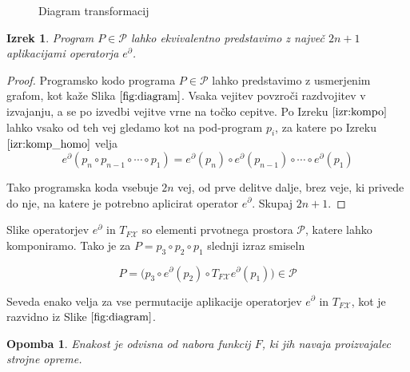 \documentclass{article}
\newcommand{\X}{\mathcal{X}}
\newcommand{\dP}{\mathcal{P}}
\newcommand{\D}{\partial}
\newtheorem{izrek}{Izrek}[section]
\newtheorem{opomba}{Opomba}[section]
\begin{document}
\begin{figure}[!h]
\vspace{3px}
\caption{Diagram transformacij} \label{fig:diagram} 
\end{figure}

\begin{izrek}
Program $P\in\dP$ lahko ekvivalentno predstavimo z največ $2n+1$ aplikacijami operatorja $e^\D$.
\end{izrek}

\begin{proof}
	Programsko kodo programa $P\in\dP$ lahko predstavimo z usmerjenim grafom, kot kaže Slika $\ref{fig:diagram}$. Vsaka vejitev povzroči razdvojitev v izvajanju, a se po izvedbi vejitve vrne na točko cepitve.	
	Po Izreku $\ref{izr:kompo}$ lahko vsako od teh vej gledamo kot na pod-program $p_i$, za katere po Izreku $\ref{izr:komp_homo}$ velja $$e^\D(p_n\circ p_{n-1}\circ\cdots\circ p_1)=e^\D(p_n)\circ e^\D(p_{n-1})\circ\cdots\circ e^\D(p_1)$$
	
	Tako programska koda vsebuje $2n$ vej, od prve delitve dalje, brez veje, ki privede do nje, na katere je potrebno aplicirat operator $e^\D$. Skupaj $2n+1$.
\end{proof}

Slike operatorjev $e^\D$ in $T_{F\X}$ so elementi prvotnega prostora $\dP$, katere lahko komponiramo. Tako je za $P=p_3\circ p_2\circ p_1$ slednji izraz smiseln

\begin{equation}
P=\Big(p_3\circ e^ \D(p_2)\circ T_{F\X}e^\D(p_1)\Big) \in \dP
\end{equation}

Seveda enako velja za vse permutacije aplikacije operatorjev $e^\D$ in $T_{F\X}$, kot je razvidno iz Slike $\ref{fig:diagram}$.

\begin{opomba}
Enakost je odvisna od nabora funkcij $F$, ki jih navaja proizvajalec strojne opreme.
\end{opomba}
\end{document}

